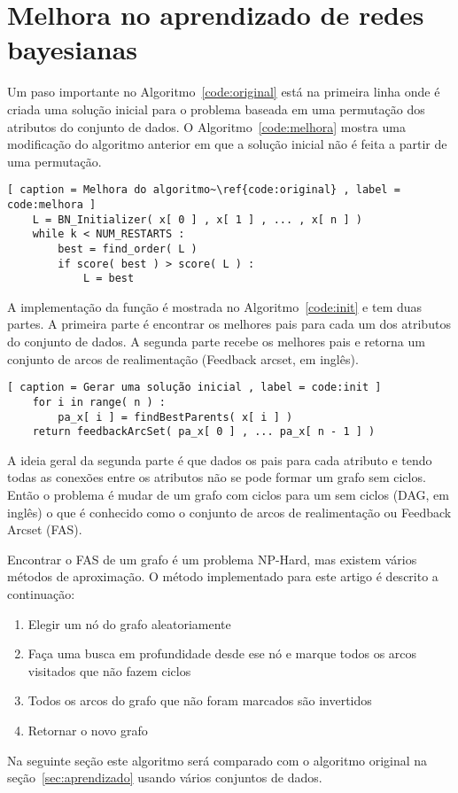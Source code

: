 \section{Melhora no aprendizado de redes bayesianas}
\label{sec:melhora}

Um paso importante no Algoritmo~\ref{code:original} está na primeira linha onde é criada uma solução inicial para o problema baseada em uma permutação dos atributos do conjunto de dados. O Algoritmo~\ref{code:melhora} mostra uma modificação do algoritmo anterior em que a solução inicial não é feita a partir de uma permutação.

\begin{lstlisting}[ caption = Melhora do algoritmo~\ref{code:original} , label = code:melhora ]
	L = BN_Initializer( x[ 0 ] , x[ 1 ] , ... , x[ n ] )
	while k < NUM_RESTARTS :
		best = find_order( L )
		if score( best ) > score( L ) :
			L = best
\end{lstlisting}

A implementação da função é mostrada no Algoritmo~\ref{code:init} e tem duas partes. A primeira parte é encontrar os melhores pais para cada um dos atributos do conjunto de dados. A segunda parte recebe os melhores pais e retorna um conjunto de arcos de realimentação (Feedback arcset, em inglês).

\begin{lstlisting}[ caption = Gerar uma solução inicial , label = code:init ]
	for i in range( n ) :
		pa_x[ i ] = findBestParents( x[ i ] )
	return feedbackArcSet( pa_x[ 0 ] , ... pa_x[ n - 1 ] )
\end{lstlisting}

A ideia geral da segunda parte é que dados os pais para cada atributo e tendo todas as conexões entre os atributos não se pode formar um grafo sem ciclos. Então o problema é mudar de um grafo com ciclos para um sem ciclos (DAG, em inglês) o que é conhecido como o conjunto de arcos de realimentação ou Feedback Arcset (FAS).

Encontrar o FAS de um grafo é um problema NP-Hard, mas existem vários métodos de aproximação. O método implementado para este artigo é descrito a continuação:

\begin{enumerate}
	\item Elegir um nó do grafo aleatoriamente
	\item Faça uma busca em profundidade desde ese nó e marque todos os arcos visitados que não fazem ciclos
	\item Todos os arcos do grafo que não foram marcados são invertidos
	\item Retornar o novo grafo
\end{enumerate}

Na seguinte seção este algoritmo será comparado com o algoritmo original na seção~\ref{sec:aprendizado} usando vários conjuntos de dados.
